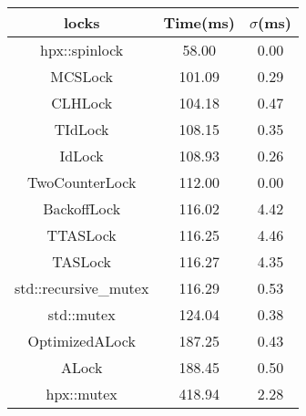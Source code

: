 \begin{tabular}{|c|c|c|}
\hline
\textbf{locks} & \textbf{Time(ms)} & \textbf{$\sigma$(ms)} \\
\hline
hpx::spinlock & 58.00 & 0.00 \\
\hline
MCSLock & 101.09 & 0.29 \\
\hline
CLHLock & 104.18 & 0.47 \\
\hline
TIdLock & 108.15 & 0.35 \\
\hline
IdLock & 108.93 & 0.26 \\
\hline
TwoCounterLock & 112.00 & 0.00 \\
\hline
BackoffLock & 116.02 & 4.42 \\
\hline
TTASLock & 116.25 & 4.46 \\
\hline
TASLock & 116.27 & 4.35 \\
\hline
std::recursive_mutex & 116.29 & 0.53 \\
\hline
std::mutex & 124.04 & 0.38 \\
\hline
OptimizedALock & 187.25 & 0.43 \\
\hline
ALock & 188.45 & 0.50 \\
\hline
hpx::mutex & 418.94 & 2.28 \\
\hline
\end{tabular}
